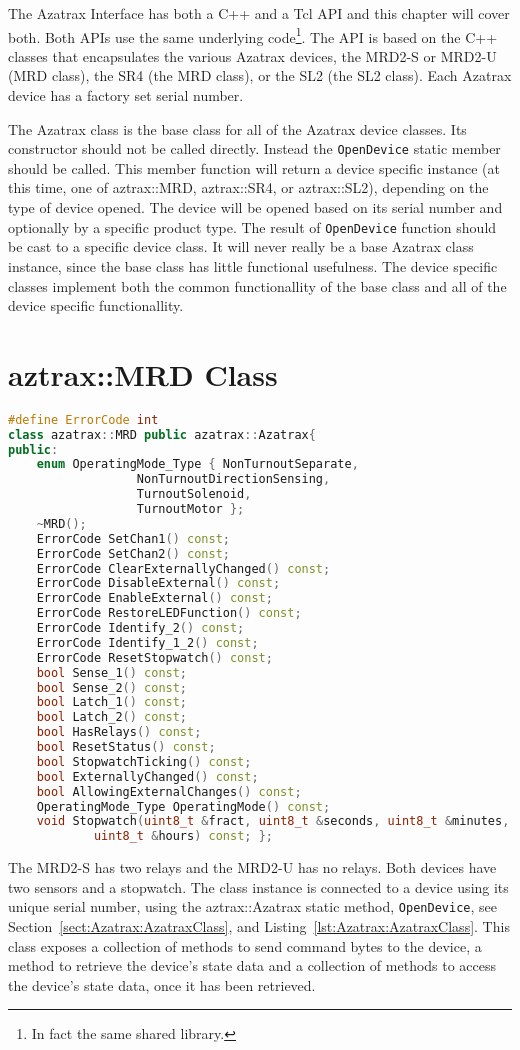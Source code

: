 The Azatrax Interface\cite{internals} has both a C++ and a Tcl API and
this chapter will cover both. Both APIs use the same underlying
code\footnote{In fact the same shared library.}. The API is based on the
C++ classes that encapsulates the various Azatrax devices, the MRD2-S or
MRD2-U (MRD class), the SR4 (the MRD class), or the SL2 (the SL2 class).
Each Azatrax device has a factory set serial number.

The Azatrax class is the base class for all of the Azatrax device
classes. Its constructor should not be called directly.  Instead the
\texttt{OpenDevice} static member should be called.  This member
function will return a device specific instance (at this time, one of
aztrax::MRD, aztrax::SR4, or aztrax::SL2), depending on the type of
device opened.  The device will be opened based on its serial number
and optionally by a specific product type.  The result of
\texttt{OpenDevice} function should be cast to a specific device class.
It will never really be a base Azatrax class instance, since the base
class has little functional usefulness.  The device specific classes
implement both the common functionallity of the base class and all of
the device specific functionallity.

\section{aztrax::MRD Class}
\begin{lstlisting}[caption={azatrax::MRD Class (simplified public interface)},
		   language=C++,label=lst:Azatrax:MRDClass]
#define ErrorCode int
class azatrax::MRD public azatrax::Azatrax{
public:
	enum OperatingMode_Type { NonTurnoutSeparate,
				  NonTurnoutDirectionSensing, 
				  TurnoutSolenoid, 
				  TurnoutMotor };
	~MRD();
	ErrorCode SetChan1() const;
	ErrorCode SetChan2() const;
	ErrorCode ClearExternallyChanged() const;
	ErrorCode DisableExternal() const;
	ErrorCode EnableExternal() const;
	ErrorCode RestoreLEDFunction() const;
	ErrorCode Identify_2() const;
	ErrorCode Identify_1_2() const;
	ErrorCode ResetStopwatch() const;
	bool Sense_1() const;
	bool Sense_2() const;
	bool Latch_1() const;
	bool Latch_2() const;
	bool HasRelays() const;
	bool ResetStatus() const;
	bool StopwatchTicking() const;
	bool ExternallyChanged() const;
	bool AllowingExternalChanges() const;
	OperatingMode_Type OperatingMode() const;
	void Stopwatch(uint8_t &fract, uint8_t &seconds, uint8_t &minutes,
			uint8_t &hours) const; }; 
\end{lstlisting} 
The MRD2-S has two relays and the MRD2-U has no relays.  Both devices
have two sensors and a stopwatch. The class instance is connected to a
device using its unique serial number, using the aztrax::Azatrax static
method, \texttt{OpenDevice}, see
Section~\ref{sect:Azatrax:AzatraxClass}, and
Listing~\ref{lst:Azatrax:AzatraxClass}. This class exposes a collection
of methods to send command bytes to the device, a method to retrieve
the device's state data and a collection of methods to access the
device's state data, once it has been retrieved.


